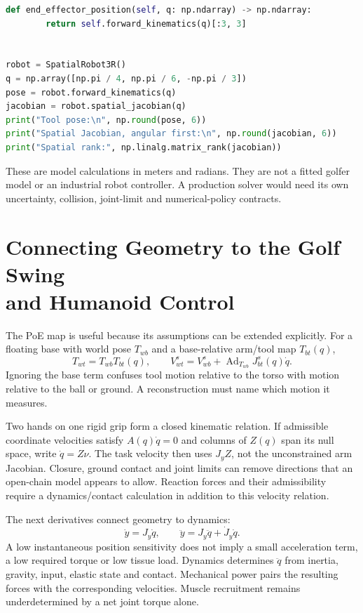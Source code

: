 \begin{lstlisting}[language=Python,basicstyle=\ttfamily\footnotesize,columns=fullflexible,keywordstyle=\color{chapblue},stringstyle=\color{purplehaze},commentstyle=\color{chapblue},numberstyle=\tiny\color{black!65}]
    def end_effector_position(self, q: np.ndarray) -> np.ndarray:
        return self.forward_kinematics(q)[:3, 3]


robot = SpatialRobot3R()
q = np.array([np.pi / 4, np.pi / 6, -np.pi / 3])
pose = robot.forward_kinematics(q)
jacobian = robot.spatial_jacobian(q)
print("Tool pose:\n", np.round(pose, 6))
print("Spatial Jacobian, angular first:\n", np.round(jacobian, 6))
print("Spatial rank:", np.linalg.matrix_rank(jacobian))
\end{lstlisting}

These are model calculations in meters and radians. They are not a fitted golfer model or an industrial robot controller. A production solver would need its own uncertainty, collision, joint-limit and numerical-policy contracts.

\section[Connecting Geometry to the Golf Swing and Humanoid Control]{Connecting Geometry to the Golf Swing\\and Humanoid Control}

The PoE map is useful because its assumptions can be extended explicitly. For a floating base with world pose $T_{wb}$ and a base-relative arm/tool map $T_{bt}(q)$,
\begin{equation}
 T_{wt}=T_{wb}T_{bt}(q),\qquad
 V_{wt}^{s}=V_{wb}^{s}+\operatorname{Ad}_{T_{wb}}J_{bt}^{s}(q)\dot q.
\end{equation}
Ignoring the base term confuses tool motion relative to the torso with motion relative to the ball or ground. A reconstruction must name which motion it measures.

Two hands on one rigid grip form a closed kinematic relation. If admissible coordinate velocities satisfy $A(q)\dot q=0$ and columns of $Z(q)$ span its null space, write $\dot q=Z\nu$. The task velocity then uses $J_yZ$, not the unconstrained arm Jacobian. Closure, ground contact and joint limits can remove directions that an open-chain model appears to allow. Reaction forces and their admissibility require a dynamics/contact calculation in addition to this velocity relation.

The next derivatives connect geometry to dynamics:
\begin{equation}
 \dot y=J_y\dot q,\qquad
 \ddot y=J_y\ddot q+\dot J_y\dot q.
\end{equation}
A low instantaneous position sensitivity does not imply a small acceleration term, a low required torque or low tissue load. Dynamics determines $\ddot q$ from inertia, gravity, input, elastic state and contact. Mechanical power pairs the resulting forces with the corresponding velocities. Muscle recruitment remains underdetermined by a net joint torque alone.

